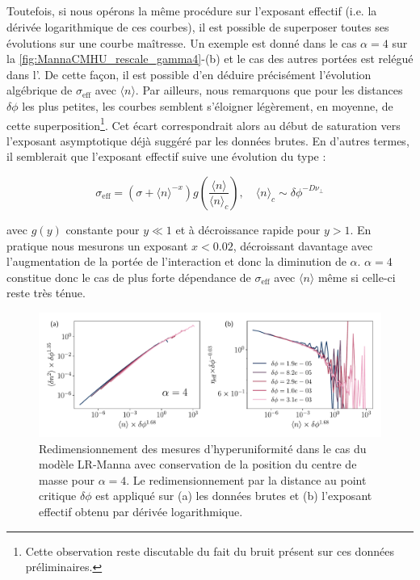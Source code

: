 \subparagraph{}Toutefois, si nous opérons la même procédure sur l'exposant effectif (i.e. la dérivée logarithmique de ces courbes), il est possible de superposer toutes ses évolutions sur une courbe maîtresse. Un exemple est donné dans le cas $\alpha=4$ sur la \autoref{fig:MannaCMHU_rescale_gamma4}-(b) et le cas des autres portées est relégué dans l'. De cette façon, il est possible d'en déduire précisément l'évolution algébrique de $\sigma_\text{eff}$ avec $\langle n \rangle$. Par ailleurs, nous remarquons que pour les distances $\delta\phi$ les plus petites, les courbes semblent s'éloigner légèrement, en moyenne, de cette superposition\footnote{Cette observation reste discutable du fait du bruit présent sur ces données préliminaires.}. Cet écart correspondrait alors au début de saturation vers l'exposant asymptotique déjà suggéré par les données brutes. En d'autres termes, il semblerait que l'exposant effectif suive une évolution du type :

\begin{equation}
	\sigma_\text{eff}  = \left( \sigma + \langle n \rangle^{-x} \right)g\left( \frac {\langle n \rangle }{\langle n \rangle_c} \right), \quad \langle n \rangle_c \sim \delta\phi^{-D\nu_\perp}
	\label{eq:esposantHULoi}
\end{equation}

\noindent avec $g(y)$ constante pour $y \ll 1$ et à décroissance rapide pour $y>1$. En pratique nous mesurons un exposant $x < 0.02$, décroissant davantage avec l'augmentation de la portée de l'interaction et donc la diminution de $\alpha$. $\alpha=4$ constitue donc le cas de plus forte dépendance de $\sigma_\text{eff}$ avec $\langle n \rangle$ même si celle-ci reste très ténue. 

\begin{figure}[h]
	\centering
	\includegraphics[width=\textwidth]{Chapitre2/Figures/Hyperuniformity/RescaleHU_MannaCM_Gamma4.pdf}
	\caption{Redimensionnement des mesures d'hyperuniformité dans le cas du modèle LR-Manna avec conservation de la position du centre de masse pour $\alpha=4$. Le redimensionnement par la distance au point critique $\delta\phi$ est appliqué sur (a) les données brutes et (b) l'exposant effectif obtenu par dérivée logarithmique.}
	\label{fig:MannaCMHU_rescale_gamma4}
\end{figure}


